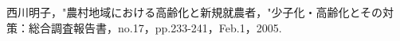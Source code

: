 \begin{thebibliography}{99}
    西川明子，"農村地域における高齢化と新規就農者，"少子化・高齢化とその対策：総合調査報告書，no.17，pp.233-241，Feb.1，2005.
\end{thebibliography}

